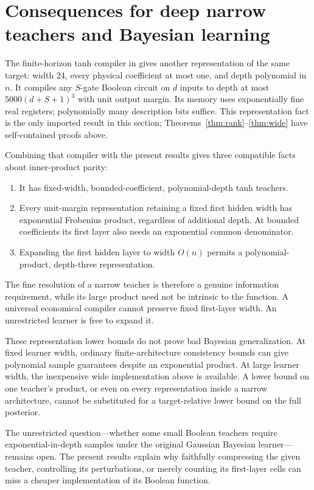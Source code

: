 \documentclass[11pt]{article}
\theoremstyle{remark}\newtheorem{remark}[theorem]{Remark}
\begin{document}
\section{Consequences for deep narrow teachers and Bayesian learning}
The finite-horizon tanh compiler in \cite[constant-width compiler
appendix]{parallel} gives another representation of the same target:
width $24$, every physical coefficient at most one, and depth polynomial
in $n$. It compiles any $S$-gate Boolean circuit on $d$ inputs to depth
at most $5000(d+S+1)^3$ with unit output margin. Its memory uses
exponentially fine real registers; polynomially many description bits
suffice. This representation fact is the only imported result in this
section; Theorems~\ref{thm:rank}--\ref{thm:wide} have self-contained
proofs above.

Combining that compiler with the present results gives three compatible
facts about inner-product parity:
\begin{enumerate}[leftmargin=*]
\item It has fixed-width, bounded-coefficient, polynomial-depth tanh
teachers.
\item Every unit-margin representation retaining a fixed first hidden
width has exponential Frobenius product, regardless of additional depth.
At bounded coefficients its first layer also needs an exponential common
denominator.
\item Expanding the first hidden layer to width $O(n)$ permits a
polynomial-product, depth-three representation.
\end{enumerate}
The fine resolution of a narrow teacher is therefore a genuine information
requirement, while its large product need not be intrinsic to the function.
A universal economical compiler cannot preserve fixed first-layer width.
An unrestricted learner is free to expand it.

These representation lower bounds do not prove bad Bayesian
generalization. At fixed learner width, ordinary finite-architecture
consistency bounds can give polynomial sample guarantees despite an
exponential product. At large learner width, the inexpensive wide
implementation above is available. A lower bound on one teacher's product,
or even on every representation inside a narrow architecture, cannot be
substituted for a target-relative lower bound on the full posterior.

The unrestricted question---whether some small Boolean teachers require
exponential-in-depth samples under the original Gaussian Bayesian
learner---remains open. The present results explain why faithfully
compressing the given teacher, controlling its perturbations, or merely
counting its first-layer cells can miss a cheaper implementation of its
Boolean function.
\end{document}
